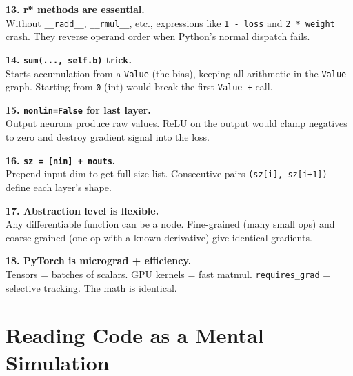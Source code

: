 \documentclass[12pt,a4paper]{article}
\newcommand{\code}[1]{\texttt{\small\color{deepblue}#1}}
\begin{document}
\begin{stickybox}
\textbf{13. r* methods are essential.}\\
Without \code{\_\_radd\_\_}, \code{\_\_rmul\_\_}, etc., expressions like \code{1 - loss} and \code{2 * weight} crash. They reverse operand order when Python's normal dispatch fails.
\end{stickybox}

\begin{stickybox}
\textbf{14. \texttt{sum(..., self.b)} trick.}\\
Starts accumulation from a \code{Value} (the bias), keeping all arithmetic in the \code{Value} graph. Starting from \code{0} (int) would break the first \code{Value +} call.
\end{stickybox}

\begin{stickybox}
\textbf{15. \texttt{nonlin=False} for last layer.}\\
Output neurons produce raw values. ReLU on the output would clamp negatives to zero and destroy gradient signal into the loss.
\end{stickybox}

\begin{stickybox}
\textbf{16. \texttt{sz = [nin] + nouts}.}\\
Prepend input dim to get full size list. Consecutive pairs \code{(sz[i], sz[i+1])} define each layer's shape.
\end{stickybox}

\begin{stickybox}
\textbf{17. Abstraction level is flexible.}\\
Any differentiable function can be a node. Fine-grained (many small ops) and coarse-grained (one op with a known derivative) give identical gradients.
\end{stickybox}

\begin{stickybox}
\textbf{18. PyTorch is micrograd + efficiency.}\\
Tensors = batches of scalars. GPU kernels = fast matmul. \code{requires\_grad} = selective tracking. The math is identical.
\end{stickybox}

\section{Reading Code as a Mental Simulation}
\end{document}
